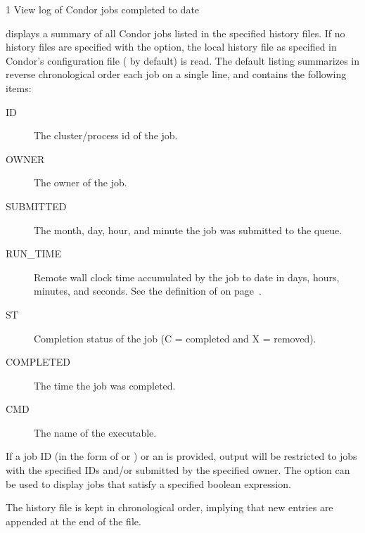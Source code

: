 \begin{ManPage}{\label{man-condor-history}}{1}
{View log of Condor jobs completed to date}
\Synopsis
{}


\Description
{} displays a summary of all Condor jobs listed in the
specified history files.
If no history files are specified with the  option, 
the local history file as specified in Condor's configuration file
( by default) is read.  
The default listing summarizes in reverse chronological order
each job on a single line, and  contains the following items:


\begin{description}
\item[ID] The cluster/process id of the job. 
\item[OWNER] The owner of the job. 
\item[SUBMITTED] The month, day, hour, and minute the job was submitted to the queue. 
\item[RUN\_TIME] Remote wall clock time accumulated by the job to date in days, hours, minutes, and seconds.  See the definition of
 on page~\pageref{RemoteWallClockTime}.
\item[ST] Completion status of the job (C = completed and X = removed).
\item[COMPLETED] The time the job was completed.
\item[CMD] The name of the executable. 
\end{description}

If a job ID (in the form of  or ) or an
 is provided, output will be restricted to jobs with the
specified IDs and/or submitted by the specified owner.  
The  option can be used to display jobs that satisfy a
specified boolean expression.

The history file is kept in chronological order,
implying that new entries are appended at the end of the
file.


\end{ManPage}
